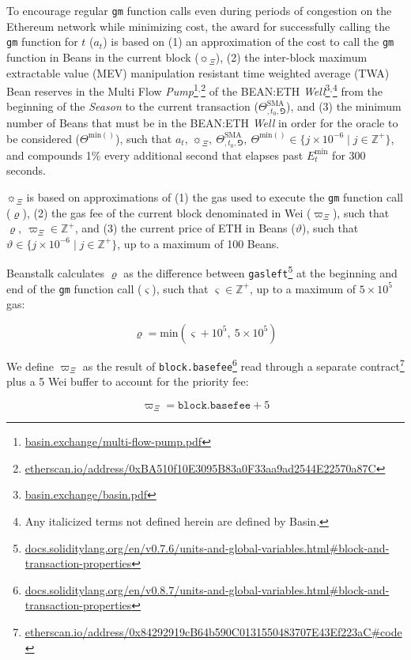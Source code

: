 \documentclass[tikz]{article}
\newcommand{\code}[1]{\texttt{#1}}
\newcommand{\term}[1]{\textsl{#1}}
\newcommand{\fref}[1]{\footnote{\href{http://#1}{#1}}}
\newcommand{\bean}{} %
\begin{document}
To encourage regular \code{gm} function calls even during periods of congestion on the Ethereum network while minimizing cost, the award for successfully calling the \code{gm} function for $t$ ($a_t$) is based on (1) an approximation of the cost to call the \code{gm} function in Beans in the current block ($\sun_{\Xi}$), (2) the inter-block maximum extractable value (MEV) manipulation resistant time weighted average (TWA) Bean reserves in the Multi Flow \term{Pump}\fref{basin.exchange/multi-flow-pump.pdf}$^{,}$\fref{etherscan.io/address/0xBA510f10E3095B83a0F33aa9ad2544E22570a87C} of the BEAN:ETH \term{Well}\fref{basin.exchange/basin.pdf}$^{,}$\footnote{Any italicized terms not defined herein are defined by Basin.} from the beginning of the \term{Season} to the current transaction ($\Theta^{\text{SMA}}_{\bean,t_0,\Game}$), and (3) the minimum number of Beans that must be in the BEAN:ETH \term{Well} in order for the oracle to be considered ($\Theta^{\text{min}(\bean)}$), such that $a_t,\ \sun_{\Xi},\ \Theta^{\text{SMA}}_{\bean,t_0,\Game},\ \Theta^{\text{min}(\bean)} \in \{j \times 10^{-6} \mid j \in \mathbb{Z}^{+} \}$, and compounds 1\% every additional second that elapses past $E_t^{\text{min}}$ for 300 seconds. 

$\sun_{\Xi}$ is based on approximations of (1) the gas used to execute the \code{gm} function call ($\varrho$), (2) the gas fee of the current block denominated in Wei ($\varpi_\Xi$), such that $\varrho,\ \varpi_\Xi \in \mathbb{Z}^{+}$, and (3) the current price of ETH in Beans ($\vartheta$), such that $\vartheta \in \{j \times 10^{-6} \mid j \in \mathbb{Z}^{+} \}$, up to a maximum of 100 Beans.

Beanstalk calculates $\varrho$ as the difference between \code{gasleft}\fref{docs.soliditylang.org/en/v0.7.6/units-and-global-variables.html\#block-and-transaction-properties} at the beginning and end of the \code{gm} function call ($\varsigma$), such that $\varsigma \in \mathbb{Z}^{+}$, up to a maximum of $5 \times 10^5$ gas:

$$\varrho = \text{min}(\varsigma + 10^5,\ 5 \times 10^5)$$

We define $\varpi_\Xi$ as the result of \code{block.basefee}\fref{docs.soliditylang.org/en/v0.8.7/units-and-global-variables.html\#block-and-transaction-properties} read through a separate contract\fref{etherscan.io/address/0x84292919cB64b590C0131550483707E43Ef223aC\#code} plus a 5 Wei buffer to account for the priority fee:

$$\varpi_\Xi = \code{block.basefee} + 5$$
\end{document}
